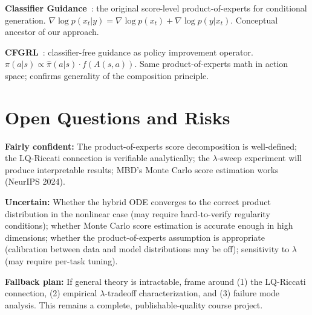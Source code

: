 \documentclass[letterpaper, 10pt, conference]{ieeeconf}
\begin{document}
\textbf{Classifier Guidance}~\cite{dhariwal2021diffusion}: the original
score-level product-of-experts for conditional generation.
$\nabla\log p(x_t|y) = \nabla\log p(x_t) + \nabla\log p(y|x_t).$
Conceptual ancestor of our approach.

\textbf{CFGRL}~\cite{cfgrl}: classifier-free guidance as policy
improvement operator. $\pi(a|s)\propto\hat{\pi}(a|s)\cdot f(A(s,a))$.
Same product-of-experts math in action space; confirms generality of the
composition principle.

\section{Open Questions and Risks}
\label{sec:openquestions}

\textbf{Fairly confident:}
The product-of-experts score decomposition is well-defined;
the LQ-Riccati connection is verifiable analytically;
the $\lambda$-sweep experiment will produce interpretable results;
MBD's Monte Carlo score estimation works (NeurIPS 2024).

\textbf{Uncertain:}
Whether the hybrid ODE converges to the correct product distribution in the
nonlinear case (may require hard-to-verify regularity conditions);
whether Monte Carlo score estimation is accurate enough in high dimensions;
whether the product-of-experts assumption is appropriate (calibration between
data and model distributions may be off);
sensitivity to $\lambda$ (may require per-task tuning).

\textbf{Fallback plan:}
If general theory is intractable, frame around (1) the LQ-Riccati connection,
(2) empirical $\lambda$-tradeoff characterization, and (3) failure mode analysis.
This remains a complete, publishable-quality course project.




\end{document}
